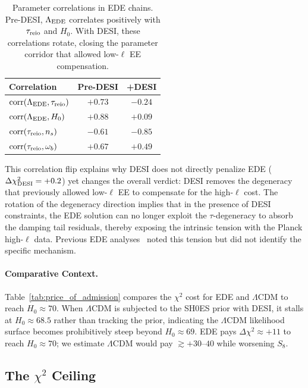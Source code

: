 \documentclass[a4paper,11pt]{article}
\begin{document}
\begin{table}[ht]
\centering
\caption{Parameter correlations in EDE chains. Pre-DESI, $\Lambda_{\rm EDE}$ correlates positively with $\tau_{\rm reio}$ and $H_0$. With DESI, these correlations rotate, closing the parameter corridor that allowed low-$\ell$ EE compensation.}
\label{tab:correlation_flip}
\begin{tabular}{lcc}
\toprule
\textbf{Correlation} & \textbf{Pre-DESI} & \textbf{+DESI} \\
\midrule
$\mathrm{corr}(\Lambda_{\rm EDE}, \tau_{\rm reio})$ & $\mathbf{+0.73}$ & $\mathbf{-0.24}$ \\
$\mathrm{corr}(\Lambda_{\rm EDE}, H_0)$ & $+0.88$ & $+0.09$ \\
$\mathrm{corr}(\tau_{\rm reio}, n_s)$ & $-0.61$ & $-0.85$ \\
$\mathrm{corr}(\tau_{\rm reio}, \omega_b)$ & $+0.67$ & $+0.49$ \\
\bottomrule
\end{tabular}
\end{table}

This correlation flip explains why DESI does not directly penalize EDE ($\Delta\chi^2_{\rm DESI} = +0.2$) yet changes the overall verdict: DESI removes the degeneracy that previously allowed low-$\ell$ EE to compensate for the high-$\ell$ cost. The rotation of the degeneracy direction implies that in the presence of DESI constraints, the EDE solution can no longer exploit the $\tau$-degeneracy to absorb the damping tail residuals, thereby exposing the intrinsic tension with the Planck high-$\ell$ data. Previous EDE analyses~\cite{Hill2020,Ivanov2020,Schoneberg_hints,Smith2022} noted this tension but did not identify the specific mechanism.

\paragraph{Comparative Context.}
\label{sec:price_of_admission}
Table~\ref{tab:price_of_admission} compares the $\chi^2$ cost for EDE and $\Lambda$CDM to reach $H_0 \approx 70$. When $\Lambda$CDM is subjected to the SH0ES prior with DESI, it stalls at $H_0 \approx 68.5$ rather than tracking the prior, indicating the $\Lambda$CDM likelihood surface becomes prohibitively steep beyond $H_0 \approx 69$. EDE pays $\Delta\chi^2 \approx +11$ to reach $H_0 \approx 70$; we estimate $\Lambda$CDM would pay $\gtrsim +30$--$40$ while worsening $S_8$.

\subsection*{The $\chi^2$ Ceiling}
\end{document}
